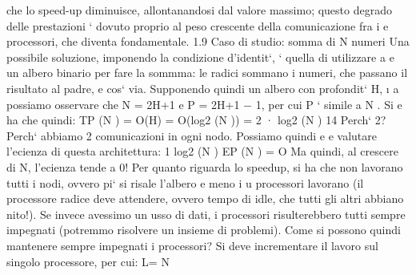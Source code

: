 \documentclass[a4paper,12pt]{article}
\begin{document}
che lo speed-up diminuisce, allontanandosi dal valore massimo; questo degrado
delle prestazioni ` dovuto proprio al peso crescente della comunicazione fra i
e
processori, che diventa fondamentale.
1.9
Caso di studio: somma di N numeri
Una possibile soluzione, imponendo la condizione d'identit`, ` quella di utilizzare
a e
un albero binario per fare la sommma: le radici sommano i numeri, che passano
il risultato al padre, e cos` via. Supponendo quindi un albero con profondit` H,
\i{}
a
possiamo osservare che N = 2H+1 e P = 2H+1 $-$ 1, per cui P ` simile a N . Si
e
ha che quindi:
TP (N ) = O(H)
= O(log2 (N ))
= 2 · log2 (N )
14
\newpage
Perch` 2? Perch` abbiamo 2 comunicazioni in ogni nodo. Possiamo quindi
e
e
valutare l'ecienza di questa architettura:
1
log2 (N )
EP (N ) = O
Ma quindi, al crescere di N, l'ecienza tende a 0! Per quanto riguarda lo speedup, si ha che non lavorano tutti i nodi,
ovvero pi` si risale l'albero e meno i
u
processori lavorano (il processore radice deve attendere, ovvero tempo di idle,
che tutti gli altri abbiano nito!). Se invece avessimo un usso di dati, i processori risulterebbero tutti sempre
impegnati (potremmo risolvere un insieme di
problemi).
Come si possono quindi mantenere sempre impegnati i processori? Si deve
incrementare il lavoro sul singolo processore, per cui:
L=
N
\end{document}
